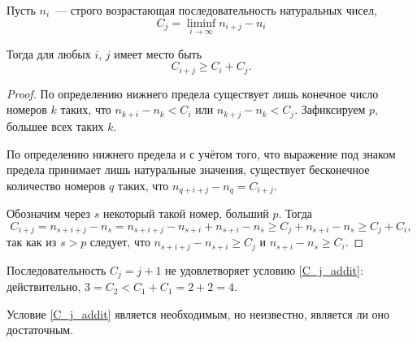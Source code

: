 \begin{lemma}
	Пусть $n_i$~--- строго возрастающая последовательность натуральных чисел,
	\begin{equation}
		C_j = \liminf_{i\to\infty} n_{i+j} - n_i
	\end{equation}

	Тогда для любых $i$, $j$ имеет место быть
	\begin{equation}\label{C_j_addit}
		C_{i+j} \geq C_i + C_j
		.
	\end{equation}
\end{lemma}

\begin{proof}
	По определению нижнего предела существует лишь конечное число номеров $k$
	таких, что $n_{k+i} - n_k < C_i$ или $n_{k+j} - n_k < C_j$.
	Зафиксируем $p$, большее всех таких $k$.

	По определению нижнего предела и с учётом того, что выражение под знаком предела
	принимает лишь натуральные значения,
	существует бесконечное количество номеров $q$ таких, что $n_{q+i+j} - n_q = C_{i+j}$.

	Обозначим через $s$ некоторый такой номер, больший $p$.
	Тогда
	\begin{equation}
		C_{i+j} = n_{s+i+j} - n_s = n_{s+i+j} - n_{s+i} + n_{s+i} - n_s
		\geq C_j + n_{s+i} - n_s \geq C_j + C_i,
	\end{equation}
	так как из $s>p$ следует, что $n_{s+i+j} - n_{s+i} \geq C_j$ и $n_{s+i} - n_s \geq C_i$.
\end{proof}

\begin{example}
	Последовательность $C_j = j+1$ не удовлетворяет условию \eqref{C_j_addit}:
	действительно, $3=C_2 < C_1+C_1 = 2+2 = 4$.
\end{example}

\begin{remark}
	Условие \eqref{C_j_addit} является необходимым, но неизвестно, является ли оно достаточным.
\end{remark}
